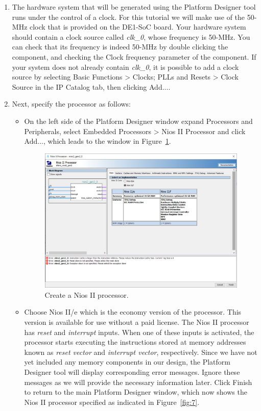\documentclass[11pt, twoside, pdftex]{article}
\begin{document}
\begin{enumerate}
\item  The hardware system that will be generated using the Platform Designer tool
runs under the control of a clock. For this tutorial we
will make use of the 50-MHz clock that is provided on the DE1-SoC board.
Your hardware system should contain a clock source called {\it clk\_0}, whose
frequency is 50-MHz. You can check that its frequency is indeed 50-MHz by
double clicking the component, and checking the {\sf Clock frequency} parameter of the component.
If your system does not already contain {\it clk\_0}, it is possible to add a clock source by selecting 
{\sf Basic Functions > Clocks; PLLs and Resets > Clock Source} in the {\sf IP Catalog} tab, then clicking {\sf Add...}.
~\\

\item Next, specify the processor as follows:
\begin{itemize}
\item On the left side of the Platform Designer window expand {\sf Processors and Peripherals}, select 
{\sf Embedded Processors > Nios II Processor}
and click {\sf Add...}, which leads to the window in Figure~\ref{fig:6}.

\begin{figure}[H]
   \begin{center}
      \includegraphics[scale=0.5]{figures/figure6.png}
   		\caption{Create a Nios II processor.} 
			\label{fig:6}
	  \end{center}
\end{figure}
\item Choose Nios II/e which is the economy version of the processor. This version is available for use without a paid license.
The Nios II processor has {\it reset} and
{\it interrupt} inputs. When one of these inputs is activated, the processor starts executing 
the instructions stored at memory addresses known as {\it reset vector} and
{\it interrupt vector}, respectively. Since we have not yet included any memory components in
our design, the Platform Designer tool will display corresponding error messages. Ignore these messages 
as we will provide the necessary information later.
Click {\sf Finish} to return to the main Platform Designer window, which now shows
the Nios II processor specified as indicated in Figure~\ref{fig:7}. 
\end{itemize}


\end{enumerate}
\end{document}
